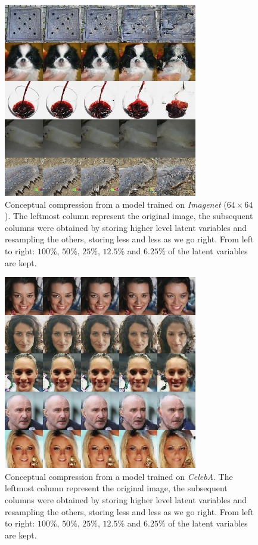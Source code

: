 \documentclass{article}
\begin{document}
\begin{figure}[H]
    \centering \includegraphics[width=.5\textwidth]{imnet_compression.jpg}
    \caption{Conceptual compression from a model trained on \emph{Imagenet} ($64 \times 64$). The leftmost column represent the original image, the subsequent columns were obtained by storing higher level latent variables and resampling the others, storing less and less as we go right. From left to right: $100\%$, $50\%$, $25\%$, $12.5\%$ and $6.25\%$ of the latent variables are kept.}
\end{figure}

\begin{figure}[H]
    \centering \includegraphics[width=.5\textwidth]{celeba_compression.jpg}
    \caption{Conceptual compression from a model trained on \emph{CelebA}. The leftmost column represent the original image, the subsequent columns were obtained by storing higher level latent variables and resampling the others, storing less and less as we go right. From left to right: $100\%$, $50\%$, $25\%$, $12.5\%$ and $6.25\%$ of the latent variables are kept.}
\end{figure}
\end{document}
